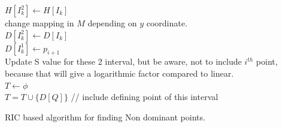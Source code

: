 \documentclass[a4paper]{article}
\begin{document}
\begin{algorithm}[H]
{{      $H[I^2_k] \leftarrow H[I_k]$ \\
       {
         {
          change mapping in $M$ depending on $y$ coordinate. \\
        }
      }
      $D[I^2_k] \leftarrow D[I_k]$ \\
      $D[I^1_k] \leftarrow p_{i+1}$ \\
      Update S value for these 2 interval, but be aware, not to include $i^{th}$ point, because that will give a logarithmic factor compared to linear. \\
 		}
 }
 $T \leftarrow \phi$ \\
  {
 	$T = T \cup \{ D[Q] \}$ // include defining point of this interval
 }

 \caption{RIC based algorithm for finding Non dominant points.}
\end{algorithm}
\pagebreak
\end{document}
